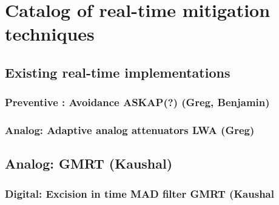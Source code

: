 \section{Catalog of real-time mitigation techniques}
\label{section:hardware:catalog}

\subsection{Existing real-time implementations}
\label{subsection:hardware:catalog:existing}
\subsubsection{Preventive : Avoidance ASKAP(?) (Greg, Benjamin)}
\subsubsection{Analog: Adaptive analog attenuators LWA (Greg)}
\subsection{Analog: GMRT (Kaushal)}
\subsubsection{Digital: Excision in time MAD filter GMRT (Kaushal}
